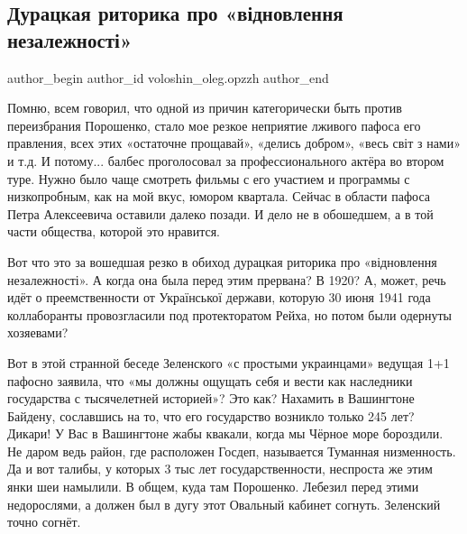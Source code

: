  
 
 
 
 
 
\subsection{Дурацкая риторика про «відновлення незалежності»}
\label{sec:27_08_2021.fb.voloshin_oleg.opzzh.1.ritorika_nezalezhnist}
 
\ifcmt
 author_begin
   author_id voloshin_oleg.opzzh
 author_end
\fi

Помню, всем говорил, что одной из причин категорически быть против переизбрания
Порошенко, стало мое резкое неприятие лживого пафоса его правления, всех этих
«остаточне прощавай», «делись добром», «весь світ з нами» и т.д. И потому...
балбес проголосовал за профессионального актёра во втором туре. Нужно было чаще
смотреть фильмы с его участием и программы с низкопробным, как на мой вкус,
юмором квартала. Сейчас в области пафоса Петра Алексеевича оставили далеко
позади. И дело не в обошедшем, а в той части общества, которой это нравится. 

Вот что это за вошедшая резко в обиход дурацкая риторика про «відновлення
незалежності». А когда она была перед этим прервана? В 1920? А, может, речь
идёт о преемственности от Української держави, которую 30 июня 1941 года
коллаборанты провозгласили под протекторатом Рейха, но потом были одернуты
хозяевами?

Вот в этой странной беседе Зеленского «с простыми украинцами» ведущая 1+1
пафосно заявила, что «мы должны ощущать себя и вести как наследники государства
с тысячелетней историей»? Это как? Нахамить в Вашингтоне Байдену, сославшись на
то, что его государство возникло только 245 лет? Дикари! У Вас в Вашингтоне
жабы квакали, когда мы Чёрное море бороздили. Не даром ведь район, где
расположен Госдеп, называется Туманная низменность. Да и вот талибы, у которых
3 тыс лет государственности, неспроста же этим янки шеи намылили. В общем, куда
там Порошенко. Лебезил перед этими недорослями, а должен был в дугу этот
Овальный кабинет согнуть. Зеленский точно согнёт.




